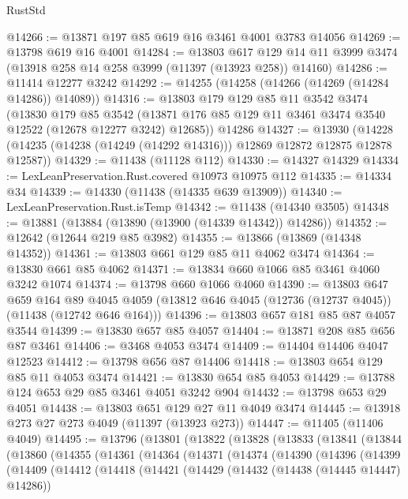 \begin{lexlean}{RustStd}
\begin{coremodule}
@14266 := @13871 @197 @85 @619 @16 @3461 @4001 @3783 @14056
@14269 := @13798 @619 @16 @4001
@14284 := @13803
    @617
    @129
    @14
    @11
    @3999
    @3474
    (@13918 @258 @14 @258 @3999 (@11397 (@13923 @258)) @14160)
@14286 := @11414 @12277 @3242
@14292 := @14255 (@14258 (@14266 (@14269 (@14284 @14286)) @14089))
@14316 := @13803
    @179
    @129
    @85
    @11
    @3542
    @3474
    (@13830
      @179
      @85
      @3542
      (@13871 @176 @85 @129 @11 @3461 @3474 @3540 @12522 (@12678 @12277 @3242) @12685))
    @14286
@14327 := @13930
    (@14228 (@14235 (@14238 (@14249 (@14292 @14316))) @12869 @12872 @12875 @12878 @12587))
@14329 := @11438 (@11128 @112)
@14330 := @14327 @14329
@14334 := LexLeanPreservation.Rust.covered @10973 @10975 @112
@14335 := @14334 @34
@14339 := @14330 (@11438 (@14335 @639 @13909))
@14340 := LexLeanPreservation.Rust.isTemp
@14342 := @11438 (@14340 @3505)
@14348 := @13881 (@13884 (@13890 (@13900 (@14339 @14342)) @14286))
@14352 := @12642 (@12644 @219 @85 @3982)
@14355 := @13866 (@13869 (@14348 @14352))
@14361 := @13803 @661 @129 @85 @11 @4062 @3474
@14364 := @13830 @661 @85 @4062
@14371 := @13834 @660 @1066 @85 @3461 @4060 @3242 @1074
@14374 := @13798 @660 @1066 @4060
@14390 := @13803
    @647
    @659
    @164
    @89
    @4045
    @4059
    (@13812 @646 @4045 (@12736 (@12737 @4045)) (@11438 (@12742 @646 @164)))
@14396 := @13803 @657 @181 @85 @87 @4057 @3544
@14399 := @13830 @657 @85 @4057
@14404 := @13871 @208 @85 @656 @87 @3461
@14406 := @3468 @4053 @3474
@14409 := @14404 @14406 @4047 @12523
@14412 := @13798 @656 @87 @14406
@14418 := @13803 @654 @129 @85 @11 @4053 @3474
@14421 := @13830 @654 @85 @4053
@14429 := @13788 @124 @653 @29 @85 @3461 @4051 @3242 @904
@14432 := @13798 @653 @29 @4051
@14438 := @13803 @651 @129 @27 @11 @4049 @3474
@14445 := @13918 @273 @27 @273 @4049 (@11397 (@13923 @273))
@14447 := @11405 (@11406 @4049)
@14495 := @13796
    (@13801
      (@13822
        (@13828
          (@13833
            (@13841
              (@13844
                (@13860
                  (@14355
                    (@14361
                      (@14364
                        (@14371
                          (@14374
                            (@14390
                              (@14396
                                (@14399
                                  (@14409
                                    (@14412
                                      (@14418
                                        (@14421
                                          (@14429
                                            (@14432 (@14438 (@14445 @14447) @14286))

\end{coremodule}
\end{lexlean}
